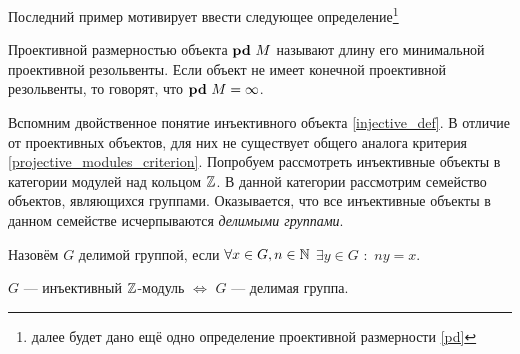 \documentclass[../main.tex]{subfiles}
\begin{document}
Последний пример мотивирует ввести следующее определение\footnote{далее будет дано ещё одно определение проективной размерности \ref{pd}}
\begin{to_def}
Проективной размерностью объекта $\mathbf{pd}\text{ } M$ называют длину его минимальной проективной резольвенты. Если объект не имеет конечной проективной резольвенты, то говорят, что $\mathbf{pd}\text{ } M = \infty$.
\end{to_def}
Вспомним двойственное понятие инъективного объекта \ref{injective_def}. В отличие от проективных объектов, для них не существует общего аналога критерия \ref{projective_modules_criterion}. Попробуем рассмотреть инъективные объекты в категории модулей над кольцом $\mathbb{Z}$. В данной категории рассмотрим семейство объектов, являющихся группами. Оказывается, что все инъективные объекты в данном семействе исчерпываются \emph{делимыми группами}.
\begin{to_def}
Назовём $G$ делимой группой, если $\forall x\in G, n\in \mathbb{N}$ $\exists y\in G$ $\colon$ $ny = x$.
\end{to_def}
\begin{to_suj}
$G$ --- инъективный $\mathbb{Z}$-модуль $\iff$ $G$ --- делимая группа.
\end{to_suj}
\end{document}
